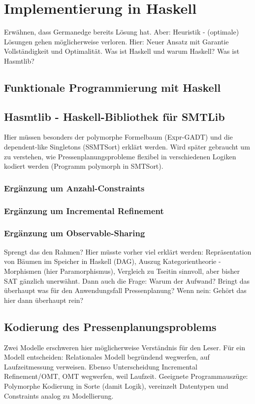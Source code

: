 \section{Implementierung in Haskell}
Erwähnen, dass Germanedge bereits Lösung hat.
Aber: Heuristik - (optimale) Lösungen gehen möglicherweise verloren.
Hier: Neuer Ansatz mit Garantie Vollständigkeit und Optimalität.
Was ist Haskell und warum Haskell?
Was ist Hasmtlib?

\subsection{Funktionale Programmierung mit Haskell}

\subsection{Hasmtlib - Haskell-Bibliothek für SMTLib}
Hier müssen besonders der polymorphe Formelbaum (Expr-GADT) und die dependent-like Singletons (SSMTSort) erklärt werden.
Wird später gebraucht um zu verstehen, wie Pressenplanungsprobleme flexibel in verschiedenen Logiken kodiert werden (Programm polymorph in SMTSort).

\subsubsection{Ergänzung um Anzahl-Constraints}

\subsubsection{Ergänzung um Incremental Refinement}

\subsubsection{Ergänzung um Observable-Sharing}
Sprengt das den Rahmen?
Hier müsste vorher viel erklärt werden:
Repräsentation von Bäumen im Speicher in Haskell (DAG),
Auszug Kategorientheorie - Morphismen (hier Paramorphismus),
Vergleich zu Tseitin sinnvoll, aber bisher SAT gänzlich unerwähnt.
Dann auch die Frage: Warum der Aufwand?
Bringt das überhaupt was für den Anwendungsfall Pressenplanung?
Wenn nein: Gehört das hier dann überhaupt rein?

\subsection{Kodierung des Pressenplanungsproblems}
Zwei Modelle erschweren hier möglicherweise Verständnis für den Leser.
Für ein Modell entscheiden: Relationales Modell begründend wegwerfen, auf Laufzeitmessung verweisen.
Ebenso Unterscheidung Incremental Refinement/OMT, OMT wegwerfen, weil Laufzeit.
Geeignete Programmauszüge: Polymorphe Kodierung in Sorte (damit Logik), vereinzelt Datentypen und Constraints analog zu Modellierung.